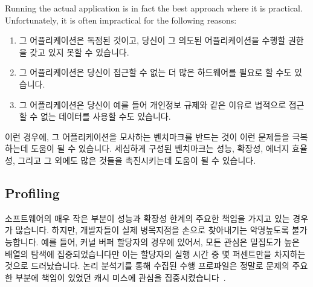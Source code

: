 Running the actual application is in fact the best approach where it is practical.
Unfortunately, it is often impractical for the following reasons:
\fi

\begin{enumerate}
\item	그 어플리케이션은 독점된 것이고, 당신이 그 의도된 어플리케이션을 수행할
	권한을 갖고 있지 못할 수 있습니다.
\item	그 어플리케이션은 당신이 접근할 수 없는 더 많은 하드웨어를 필요로 할
	수도 있습니다.
\item	그 어플리케이션은 당신이 예를 들어 개인정보 규제와 같은 이유로 법적으로
	접근할 수 없는 데이터를 사용할 수도 있습니다.

\end{enumerate}

이런 경우에, 그 어플리케이션을 모사하는 벤치마크를 반드는 것이 이런 문제들을
극복하는데 도움이 될 수 있습니다.
세심하게 구성된 벤치마크는 성능, 확장성, 에너지 효율성, 그리고 그 외에도 많은
것들을 촉진시키는데 도움이 될 수 있습니다.

\subsection{Profiling}
\label{sec:debugging:Profiling}

소프트웨어의 매우 작은 부분이 성능과 확장성 한계의 주요한 책임을 가지고 있는
경우가 많습니다.
하지만, 개발자들이 실제 병목지점을 손으로 찾아내기는 악명높도록 불가능합니다.
예를 들어, 커널 버퍼 할당자의 경우에 있어서, 모든 관심은 밀집도가 높은 배열의
탐색에 집중되었습니다만 이는 할당자의 실행 시간 중 몇 퍼센트만을 차지하는
것으로 드러났습니다.
논리 분석기를 통해 수집된 수행 프로파일은 정말로 문제의 주요한 부분에 책임이
있었던 캐시 미스에 관심을 집중시켰습니다~\cite{McKenney93}.

